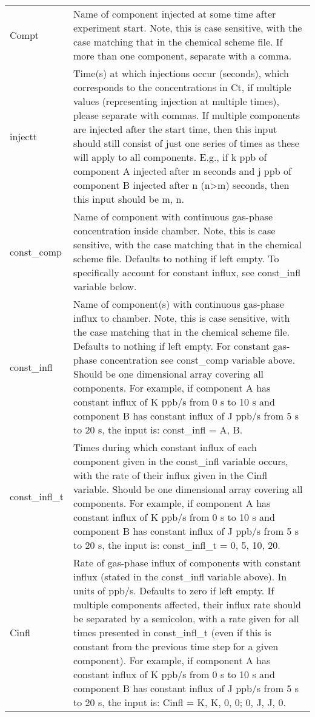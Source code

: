 \documentclass[gmd, manuscript]{copernicus}
\begin{document}
\begin{center}
\begin{supertabular}{p{0.15\textwidth}p{0.75\textwidth}}
Compt & Name of component injected at some time after experiment start.  Note, this is case sensitive, with the case matching that in the chemical scheme file.  If more than one component, separate with a comma.  \\

injectt & Time(s) at which injections occur (seconds), which corresponds to the concentrations in Ct, if multiple values (representing injection at multiple times), please separate with commas.  If multiple components are  injected after the start time, then this input should still consist of just one series of times as these will apply to all components.  E.g., if k ppb of component A injected after m seconds and j ppb of component B injected after n (n>m) seconds, then this input should be m, n.\\

const\_comp & Name of component with continuous gas-phase concentration inside chamber.  Note, this is case sensitive, with the case matching that in the chemical scheme file.  Defaults to nothing if left empty.  To specifically account for constant influx, see const\_infl variable below.\\

const\_infl & Name of component(s) with continuous gas-phase influx to chamber. Note, this is case sensitive, with the case matching that in the chemical scheme file. Defaults to nothing if left empty. For constant gas-phase concentration see const\_comp variable above. Should be one dimensional array covering all components. For example, if component A has constant influx of K ppb/s from 0 s to 10 s and component B has constant influx of J ppb/s from 5 s to 20 s, the input is: const\_infl = A, B.\\

const\_infl\_t & Times during which constant influx of each component given in the const\_infl variable occurs, with the rate of their influx given in the Cinfl variable.  Should be one dimensional array covering all components.  For example, if component A has constant influx of K ppb/s from 0 s to 10 s and component B has constant influx of J ppb/s from 5 s to 20 s, the input is: const\_infl\_t = 0, 5, 10, 20.\\

Cinfl & Rate of gas-phase influx of components with constant influx (stated in the const\_infl variable above).  In units of ppb/s.  Defaults to zero if left empty.  If multiple components affected, their influx rate should be separated by a semicolon, with a rate given for all times presented in const\_infl\_t (even if this is constant from the previous time step for a given component).  For example, if component A has constant influx of K ppb/s from 0 s to 10 s and component B has constant influx of J ppb/s from 5 s to 20 s, the input is: Cinfl = K, K, 0, 0; 0, J, J, 0.\\


\end{supertabular}
\end{center}
\end{document}

